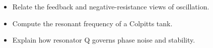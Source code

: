 \begin{objectives}
\begin{itemize}[leftmargin=1.4em,itemsep=2pt]
\item Relate the feedback and negative-resistance views of oscillation.
\item Compute the resonant frequency of a Colpitts tank.
\item Explain how resonator Q governs phase noise and stability.
\end{itemize}
\end{objectives}
